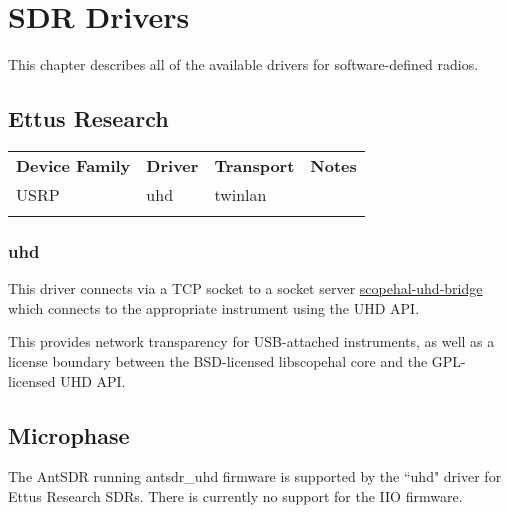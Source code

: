 \chapter{SDR Drivers}
\label{sec:sdr-drivers}

This chapter describes all of the available drivers for software-defined radios.

\section{Ettus Research}

\begin{tabularx}{16cm}{lllX}
\thickhline
\textbf{Device Family} & \textbf{Driver} & \textbf{Transport} & \textbf{Notes} \\
\thickhline
USRP & uhd & twinlan & \\
\thickhline
\end{tabularx}

\subsection{uhd}

This driver connects via a TCP socket to a socket server
\href{https://github.com/ngscopeclient/scopehal-uhd-bridge}{scopehal-uhd-bridge} which connects to the appropriate
instrument using the UHD API.

This provides network transparency for USB-attached instruments, as well as a license boundary between the BSD-licensed
libscopehal core and the GPL-licensed UHD API.

\section{Microphase}

The AntSDR running antsdr\_uhd firmware is supported by the ``uhd" driver for Ettus Research SDRs. There is currently no
support for the IIO firmware.
